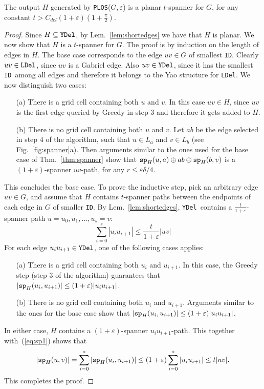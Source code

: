 \documentclass{llncs}
\newcommand{\ABox}{
\raisebox{3pt}{\framebox[6pt]{\rule{6pt}{0pt}}}
}
\newcommand{\e}{\varepsilon}
\newcommand{\id}{{\tt ID}}
\newcommand{\ssp}{{\tt sp}}
\newcommand{\palg}{{\tt PLOS}}
\newcommand{\N}{L}  \newcommand{\C}{C}
\newcommand{\ydel}{{\tt YDel}}
\newcommand{\ldel}{{\tt LDel}}
\begin{document}
\begin{theorem}
The output $H$ generated by \palg($G, \e$) is a planar $t$-spanner for $G$, for any constant $t > C_{del}(1+\e)(1+\frac{\pi}{2})$.
\label{thm:pspanner}
\end{theorem}
\begin{proof}
Since $H \subseteq \ydel$, by Lem.~\ref{lem:shortedges} we have that $H$ is planar. We now show that $H$ is a $t$-spanner for $G$. The proof is by induction on the length of edges in $H$. The base case corresponds to the edge  $uv \in G$ of smallest \id. Clearly $uv \in \ldel$, since $uv$ is a Gabriel edge. Also $uv \in \ydel$, since it has the smallest \id\ among all edges and therefore it belongs to the Yao structure for \ldel. We now distinguish two cases:
\begin{itemize}
\item [(a)] There is a grid cell containing both $u$ and $v$. In this case $uv \in H$, since $uv$ is the first edge queried by Greedy in step 3 and therefore it gets added to $H$.
\item [(b)] There is no grid cell containing both $u$ and $v$. Let $ab$ be the edge selected in step 4 of the algorithm, such that $u \in \N_{a}$ and $v \in \N_{b}$ (see Fig.~\ref{fig:spanner}a). Then arguments similar to the ones used for the base case of Thm.~\ref{thm:spanner} show that $\ssp_H(u, a) \oplus ab \oplus \ssp_H(b, v)$ is a $(1+\e)$-spanner $uv$-path, for any  $r \le \e\delta/4$. \end{itemize}
This concludes the base case. To prove the inductive step, pick an arbitrary edge $uv \in G$, and assume that $H$ contains $t$-spanner paths between the endpoints of each edge in $G$ of smaller \id. By Lem.~\ref{lem:shortedges}, \ydel\ contains a $\frac{t}{1+\e}$-spanner path $u = u_0, u_1, \ldots, u_s = v$:
\begin{equation}
\sum_{i=0}^s |u_iu_{i+1}| \le \frac{t}{1+\e} |uv|
\label{eq:sp1}
\end{equation}
For each edge $u_iu_{i+1} \in \ydel$, one of the following cases applies:
\begin{itemize}
\item [(a)] There is a grid cell containing both $u_i$ and $u_{i+1}$. In this case, the Greedy step (step 3 of the algorithm) guarantees that $|\ssp_H(u_i,u_{i+1})| \le (1+\e)|u_iu_{i+1}|$.
\item [(b)] There is no grid cell containing both $u_i$ and $u_{i+1}$. Arguments similar to the ones for the base case show that $|\ssp_H(u_i, u_{i+1})| \le (1+\e)|u_iu_{i+1}|$.
\end{itemize}
In either case, $H$ contains a $(1+\e)$-spanner $u_iu_{i+1}$-path.
This together with~(\ref{eq:sp1}) shows that
$$|\ssp_H(u, v)| = \sum_{i=0}^s |\ssp_H(u_i, u_{i+1})| \le (1+\e) \sum_{i=0}^s |u_iu_{i+1}| \le t|uv|.$$
This completes the proof. \hfill\ABox
\end{proof}
\end{document}
